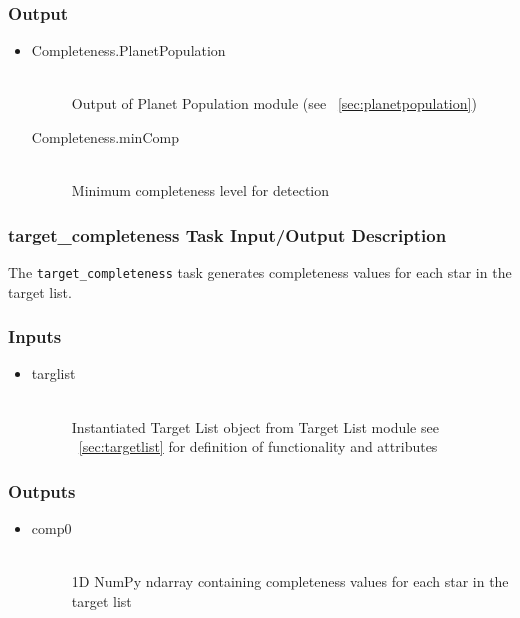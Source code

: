 \documentclass[cleanfoot]{asme2ej}
\begin{document}
\subsubsection*{Output}
\begin{itemize}
    \item 
    \begin{description}
        \item[Completeness.PlanetPopulation] \hfill \\
        Output of Planet Population module (see ~\ref{sec:planetpopulation})
        \item[Completeness.minComp] \hfill \\
        Minimum completeness level for detection
    \end{description}
\end{itemize}

\subsubsection{target\_completeness Task Input/Output Description}
\label{sec:targetcompletenesstask}
The \verb+target_completeness+ task generates completeness values for each star in the target list.

\subsubsection*{Inputs}
\begin{itemize}
    \item 
    \begin{description}
        \item[targlist] \hfill \\
        Instantiated Target List object from Target List module see ~\ref{sec:targetlist} for definition of functionality and attributes
    \end{description}
\end{itemize}

\subsubsection*{Outputs}
\begin{itemize}
    \item 
    \begin{description}
        \item[comp0] \hfill \\
        1D NumPy ndarray containing completeness values for each star in the target list
    \end{description}
\end{itemize}
\end{document}
